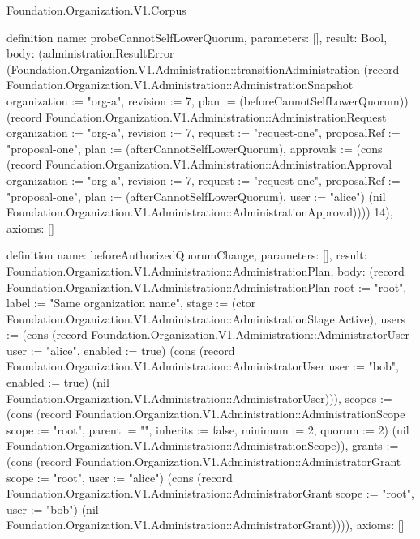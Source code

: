 \begin{lexlean}{Foundation.Organization.V1.Corpus}
\begin{semanticmodule}
definition{
  name: probeCannotSelfLowerQuorum,
  parameters: [],
  result: Bool,
  body: (administrationResultError (Foundation.Organization.V1.Administration::transitionAdministration (record Foundation.Organization.V1.Administration::AdministrationSnapshot {organization := "org-a", revision := 7, plan := (beforeCannotSelfLowerQuorum)}) (record Foundation.Organization.V1.Administration::AdministrationRequest {organization := "org-a", revision := 7, request := "request-one", proposalRef := "proposal-one", plan := (afterCannotSelfLowerQuorum), approvals := (cons (record Foundation.Organization.V1.Administration::AdministrationApproval {organization := "org-a", revision := 7, request := "request-one", proposalRef := "proposal-one", plan := (afterCannotSelfLowerQuorum), user := "alice"}) (nil Foundation.Organization.V1.Administration::AdministrationApproval))})) 14),
  axioms: []
}

definition{
  name: beforeAuthorizedQuorumChange,
  parameters: [],
  result: Foundation.Organization.V1.Administration::AdministrationPlan,
  body: (record Foundation.Organization.V1.Administration::AdministrationPlan {root := "root", label := "Same organization name", stage := (ctor Foundation.Organization.V1.Administration::AdministrationStage.Active), users := (cons (record Foundation.Organization.V1.Administration::AdministratorUser {user := "alice", enabled := true}) (cons (record Foundation.Organization.V1.Administration::AdministratorUser {user := "bob", enabled := true}) (nil Foundation.Organization.V1.Administration::AdministratorUser))), scopes := (cons (record Foundation.Organization.V1.Administration::AdministrationScope {scope := "root", parent := "", inherits := false, minimum := 2, quorum := 2}) (nil Foundation.Organization.V1.Administration::AdministrationScope)), grants := (cons (record Foundation.Organization.V1.Administration::AdministratorGrant {scope := "root", user := "alice"}) (cons (record Foundation.Organization.V1.Administration::AdministratorGrant {scope := "root", user := "bob"}) (nil Foundation.Organization.V1.Administration::AdministratorGrant)))}),
  axioms: []
}


\end{semanticmodule}
\end{lexlean}
